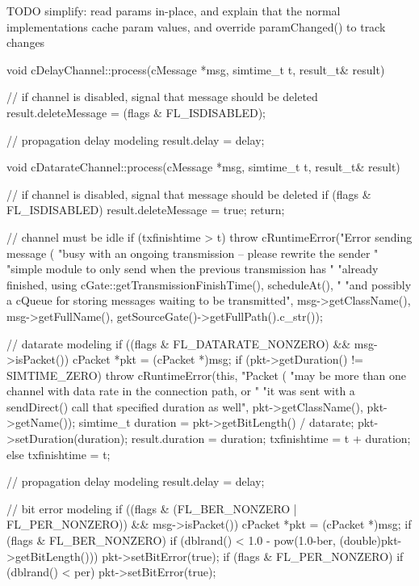 TODO simplify: read params in-place, and explain that the normal implementations cache param values, and override paramChanged() to track changes

\begin{cpp}
void cDelayChannel::process(cMessage *msg, simtime_t t, result_t& result)
{
    // if channel is disabled, signal that message should be deleted
    result.deleteMessage = (flags & FL_ISDISABLED);

    // propagation delay modeling
    result.delay = delay;
}
\end{cpp}

\begin{cpp}
void cDatarateChannel::process(cMessage *msg, simtime_t t, result_t& result)
{
    // if channel is disabled, signal that message should be deleted
    if (flags & FL_ISDISABLED)
    {
        result.deleteMessage = true;
        return;
    }

    // channel must be idle
    if (txfinishtime > t)
        throw cRuntimeError("Error sending message (%
                            "busy with an ongoing transmission -- please rewrite the sender "
                            "simple module to only send when the previous transmission has "
                            "already finished, using cGate::getTransmissionFinishTime(), scheduleAt(), "
                            "and possibly a cQueue for storing messages waiting to be transmitted",
                            msg->getClassName(), msg->getFullName(), getSourceGate()->getFullPath().c_str());

    // datarate modeling
    if ((flags & FL_DATARATE_NONZERO) && msg->isPacket())
    {
        cPacket *pkt = (cPacket *)msg;
        if (pkt->getDuration() != SIMTIME_ZERO)
            throw cRuntimeError(this, "Packet (%
                "may be more than one channel with data rate in the connection path, or "
                "it was sent with a sendDirect() call that specified duration as well",
                pkt->getClassName(), pkt->getName());
        simtime_t duration = pkt->getBitLength() / datarate;
        pkt->setDuration(duration);
        result.duration = duration;
        txfinishtime = t + duration;
    }
    else {
        txfinishtime = t;
    }

    // propagation delay modeling
    result.delay = delay;

    // bit error modeling
    if ((flags & (FL_BER_NONZERO | FL_PER_NONZERO)) && msg->isPacket())
    {
        cPacket *pkt = (cPacket *)msg;
        if (flags & FL_BER_NONZERO)
            if (dblrand() < 1.0 - pow(1.0-ber, (double)pkt->getBitLength()))
                pkt->setBitError(true);
        if (flags & FL_PER_NONZERO)
            if (dblrand() < per)
                pkt->setBitError(true);
    }
}
\end{cpp}

